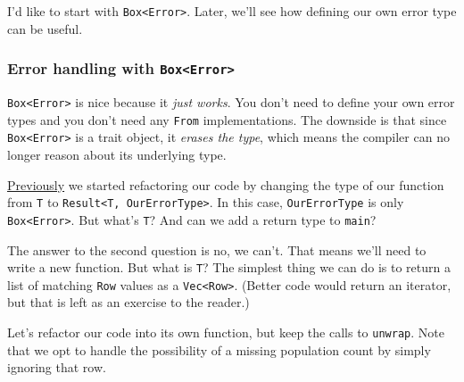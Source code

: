 \documentclass[a4paper,]{book}
\begin{document}
I'd like to start with \texttt{Box\textless{}Error\textgreater{}}.
Later, we'll see how defining our own error type can be useful.

\hypertarget{error-handling-with-boxerror}{\subsubsection{\texorpdfstring{Error
handling with
\texttt{Box\textless{}Error\textgreater{}}}{Error handling with Box\textless{}Error\textgreater{}}}\label{error-handling-with-boxerror}}

\texttt{Box\textless{}Error\textgreater{}} is nice because it \emph{just
works}. You don't need to define your own error types and you don't need
any \texttt{From} implementations. The downside is that since
\texttt{Box\textless{}Error\textgreater{}} is a trait object, it
\emph{erases the type}, which means the compiler can no longer reason
about its underlying type.

\protect\hyperlink{the-limits-of-combinators}{Previously} we started
refactoring our code by changing the type of our function from
\texttt{T} to \texttt{Result\textless{}T,\ OurErrorType\textgreater{}}.
In this case, \texttt{OurErrorType} is only
\texttt{Box\textless{}Error\textgreater{}}. But what's \texttt{T}? And
can we add a return type to \texttt{main}?

The answer to the second question is no, we can't. That means we'll need
to write a new function. But what is \texttt{T}? The simplest thing we
can do is to return a list of matching \texttt{Row} values as a
\texttt{Vec\textless{}Row\textgreater{}}. (Better code would return an
iterator, but that is left as an exercise to the reader.)

Let's refactor our code into its own function, but keep the calls to
\texttt{unwrap}. Note that we opt to handle the possibility of a missing
population count by simply ignoring that row.
\end{document}
